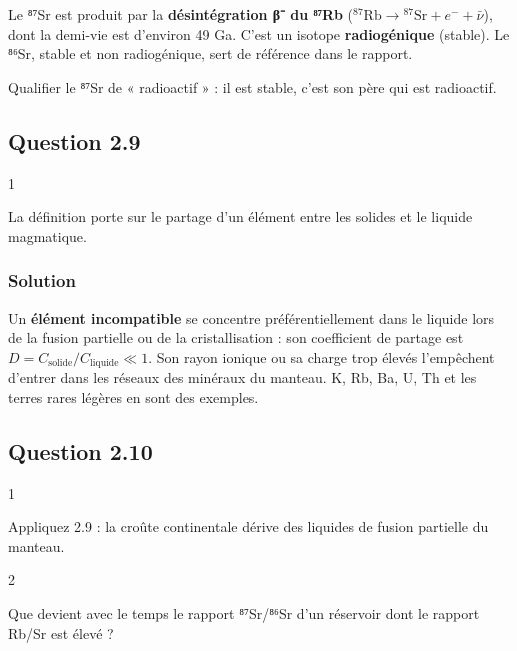 \documentclass[11pt,a4paper]{article}
\begin{document}
Le ⁸⁷Sr est produit par la \textbf{désintégration β⁻ du ⁸⁷Rb} (\(^{87}\mathrm{Rb}\rightarrow{}^{87}\mathrm{Sr}+e^-+\bar\nu\)), dont la demi-vie est d'environ 49 Ga. C'est un isotope \textbf{radiogénique} (stable). Le ⁸⁶Sr, stable et non radiogénique, sert de référence dans le rapport.

\begin{piege}

Qualifier le ⁸⁷Sr de « radioactif » : il est stable, c'est son père qui est radioactif.

\end{piege}

\hypertarget{question-2.9}{%
\subsection{Question 2.9}\label{question-2.9}}

\begin{indication}{1}

La définition porte sur le partage d'un élément entre les solides et le liquide magmatique.

\end{indication}

\hypertarget{solution-19}{%
\subsubsection{Solution}\label{solution-19}}

Un \textbf{élément incompatible} se concentre préférentiellement dans le liquide lors de la fusion partielle ou de la cristallisation : son coefficient de partage est \(D = C_{\text{solide}}/C_{\text{liquide}} \ll 1\). Son rayon ionique ou sa charge trop élevés l'empêchent d'entrer dans les réseaux des minéraux du manteau. K, Rb, Ba, U, Th et les terres rares légères en sont des exemples.

\hypertarget{question-2.10}{%
\subsection{Question 2.10}\label{question-2.10}}

\begin{indication}{1}

Appliquez 2.9 : la croûte continentale dérive des liquides de fusion partielle du manteau.

\end{indication}

\begin{indication}{2}

Que devient avec le temps le rapport ⁸⁷Sr/⁸⁶Sr d'un réservoir dont le rapport Rb/Sr est élevé ?

\end{indication}
\end{document}
